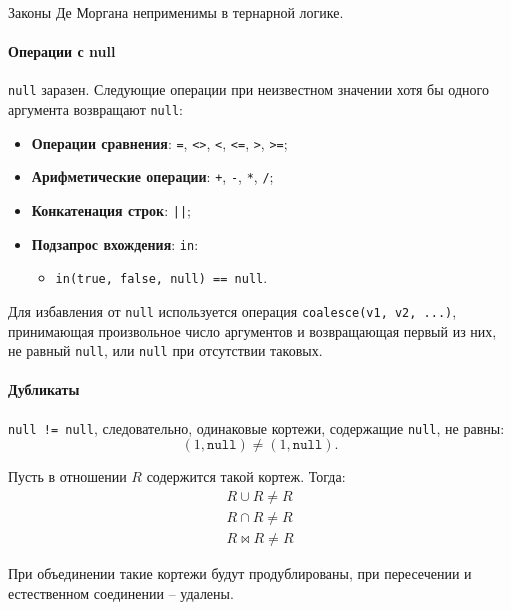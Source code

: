 \begin{proposition}
	Законы Де Моргана неприменимы в тернарной логике.
\end{proposition}

\paragraph{Операции с null}

\texttt{null} заразен. Следующие операции при неизвестном значении хотя бы одного
аргумента возвращают \texttt{null}:

\begin{itemize}
	\item \textbf{Операции сравнения}: \texttt{=}, \texttt{<>}, \texttt{<},
	      \texttt{<=}, \texttt{>}, \texttt{>=};
	\item \textbf{Арифметические операции}: \texttt{+}, \texttt{-}, \texttt{*},
	      \texttt{/};
	\item \textbf{Конкатенация строк}: \texttt{||};
	\item \textbf{Подзапрос вхождения}: \texttt{in}:
	      \begin{itemize}
		      \item \texttt{in(true, false, null) == null}.
	      \end{itemize}
\end{itemize}

Для избавления от \texttt{null} используется операция \texttt{coalesce(v1, v2, ...)},
принимающая произвольное число аргументов и возвращающая первый из них, не равный
\texttt{null}, или \texttt{null} при отсутствии таковых.

\paragraph{Дубликаты}

\texttt{null != null}, следовательно, одинаковые кортежи, содержащие \texttt{null}, не
равны: \[
	(1, \texttt{null}) \neq (1, \texttt{null}).
\]

Пусть в отношении $R$ содержится такой кортеж. Тогда:
\begin{align}
	R \cup R \neq R \\
	R \cap R \neq R \\
	R \bowtie R \neq R
\end{align}

При объединении такие кортежи будут продублированы, при пересечении и естественном соединении --
удалены.

